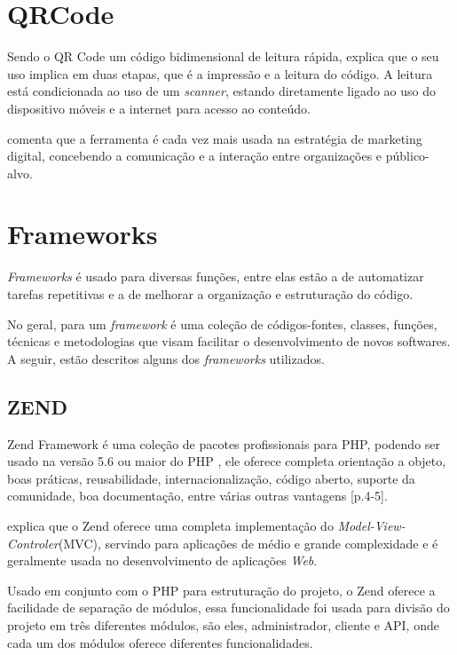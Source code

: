 \section{QRCode}
Sendo o QR Code um código bidimensional de leitura rápida, \cite{sousa2014} explica que o seu uso implica em duas etapas, que é a impressão e a leitura do código. A leitura está condicionada ao uso de um \textit{scanner}, estando diretamente ligado ao uso do dispositivo móveis e a internet para acesso ao conteúdo.

\cite{sousa2014} comenta que a ferramenta é cada vez mais usada na estratégia de marketing digital, concebendo a comunicação e a interação entre organizações e público-alvo.

\section{Frameworks}
\textit{Frameworks} é usado para diversas funções, entre elas estão a de automatizar tarefas repetitivas e a de melhorar a organização e estruturação do código.  

No geral, para \cite{minetto2007} um \textit{framework} é uma coleção de códigos-fontes, classes, funções, técnicas e metodologias que visam facilitar o desenvolvimento de novos softwares. A seguir, estão descritos alguns dos \textit{frameworks} utilizados.

\subsection{ZEND}
Zend Framework é uma coleção de pacotes profissionais para PHP, podendo ser usado na versão 5.6 ou maior do PHP \cite{zend2018}, ele oferece completa orientação a objeto, boas práticas, reusabilidade, internacionalização, código aberto, suporte da comunidade, boa documentação, entre várias outras vantagens \cite{vaswani2010}[p.4-5].

\cite[p.3]{vaswani2010} explica que o Zend oferece uma completa implementação do \textit{Model-View-Controler}(MVC), servindo para aplicações de médio e grande complexidade e é geralmente usada no desenvolvimento de aplicações \textit{Web}.

Usado em conjunto com o PHP para estruturação do projeto, o Zend oferece a facilidade de separação de módulos, essa funcionalidade foi usada para divisão do projeto em três diferentes módulos, são eles, administrador, cliente e API, onde cada um dos módulos oferece diferentes funcionalidades.

